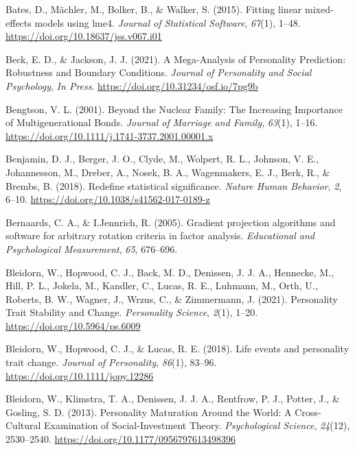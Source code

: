 \documentclass[
  english,
  man,floatsintext]{apa7}
\begin{document}
\leavevmode\hypertarget{ref-R-lme4}{}%
Bates, D., Mächler, M., Bolker, B., \& Walker, S. (2015). Fitting linear mixed-effects models using lme4. \emph{Journal of Statistical Software}, \emph{67}(1), 1--48. \url{https://doi.org/10.18637/jss.v067.i01}

\leavevmode\hypertarget{ref-beckMegaAnalysisPersonalityPrediction2021}{}%
Beck, E. D., \& Jackson, J. J. (2021). A Mega-Analysis of Personality Prediction: Robustness and Boundary Conditions. \emph{Journal of Personality and Social Psychology}, \emph{In Press}. \url{https://doi.org/10.31234/osf.io/7pg9b}

\leavevmode\hypertarget{ref-bengtsonNuclearFamilyIncreasing2001}{}%
Bengtson, V. L. (2001). Beyond the Nuclear Family: The Increasing Importance of Multigenerational Bonds. \emph{Journal of Marriage and Family}, \emph{63}(1), 1--16. \url{https://doi.org/10.1111/j.1741-3737.2001.00001.x}

\leavevmode\hypertarget{ref-benjaminRedefineStatisticalSignificance2018}{}%
Benjamin, D. J., Berger, J. O., Clyde, M., Wolpert, R. L., Johnson, V. E., Johannesson, M., Dreber, A., Nosek, B. A., Wagenmakers, E. J., Berk, R., \& Brembs, B. (2018). Redefine statistical significance. \emph{Nature Human Behavior}, \emph{2}, 6--10. \url{https://doi.org/10.1038/s41562-017-0189-z}

\leavevmode\hypertarget{ref-R-GPArotation}{}%
Bernaards, C. A., \& I.Jennrich, R. (2005). Gradient projection algorithms and software for arbitrary rotation criteria in factor analysis. \emph{Educational and Psychological Measurement}, \emph{65}, 676--696.

\leavevmode\hypertarget{ref-bleidornPersonalityTraitStability2021}{}%
Bleidorn, W., Hopwood, C. J., Back, M. D., Denissen, J. J. A., Hennecke, M., Hill, P. L., Jokela, M., Kandler, C., Lucas, R. E., Luhmann, M., Orth, U., Roberts, B. W., Wagner, J., Wrzus, C., \& Zimmermann, J. (2021). Personality Trait Stability and Change. \emph{Personality Science}, \emph{2}(1), 1--20. \url{https://doi.org/10.5964/ps.6009}

\leavevmode\hypertarget{ref-bleidornLifeEventsPersonality2018}{}%
Bleidorn, W., Hopwood, C. J., \& Lucas, R. E. (2018). Life events and personality trait change. \emph{Journal of Personality}, \emph{86}(1), 83--96. \url{https://doi.org/10.1111/jopy.12286}

\leavevmode\hypertarget{ref-bleidornPersonalityMaturationWorld2013}{}%
Bleidorn, W., Klimstra, T. A., Denissen, J. J. A., Rentfrow, P. J., Potter, J., \& Gosling, S. D. (2013). Personality Maturation Around the World: A Cross-Cultural Examination of Social-Investment Theory. \emph{Psychological Science}, \emph{24}(12), 2530--2540. \url{https://doi.org/10.1177/0956797613498396}
\end{document}

